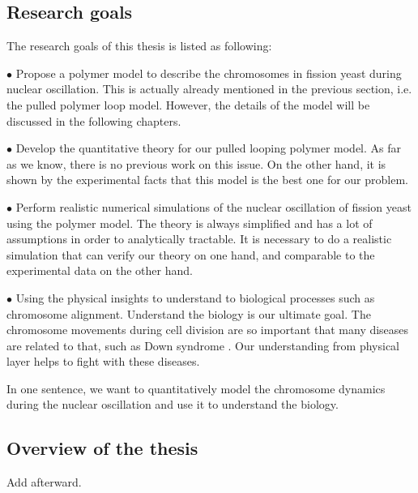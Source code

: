 \subsection{Research goals}
\label{sub:research_goal}

The research goals of this thesis is listed as following:

$\bullet$ Propose a polymer model to describe the chromosomes in fission yeast during nuclear oscillation. This is actually already mentioned in the previous section, i.e. the pulled polymer loop model. However, the details of the model will be discussed in the following chapters.

$\bullet$ Develop the quantitative theory for our pulled looping polymer model. As far as we know, there is no previous work on this issue. On the other hand, it is shown by the experimental facts that this model is the best one for our problem. 

$\bullet$ Perform realistic numerical simulations of the nuclear oscillation of fission yeast using the polymer model. The theory is always simplified and has a lot of assumptions in order to analytically tractable. It is necessary to do a realistic simulation that can verify our theory on one hand, and comparable to the experimental data on the other hand.

$\bullet$ Using the physical insights to understand to biological processes such as chromosome alignment. Understand the biology is our ultimate goal. The chromosome movements during cell division are so important that many diseases are related to that, such as Down syndrome \cite{Patterson2009}. Our understanding from physical layer helps to fight with these diseases.

In one sentence, we want to quantitatively model the chromosome dynamics during the nuclear oscillation and use it to understand the biology. 

\subsection{Overview of the thesis}
\label{sub:organisation_of_the_thesis}

Add afterward.







